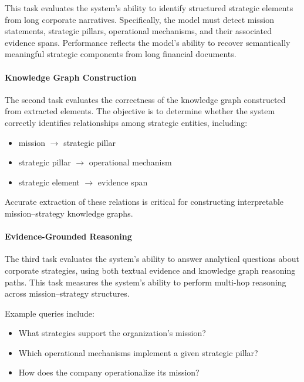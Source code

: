 \documentclass[11pt]{article}
\begin{document}
This task evaluates the system's ability to identify structured strategic elements from long corporate narratives. Specifically, the model must detect mission statements, strategic pillars, operational mechanisms, and their associated evidence spans. Performance reflects the model’s ability to recover semantically meaningful strategic components from long financial documents.

\paragraph{Knowledge Graph Construction}

The second task evaluates the correctness of the knowledge graph constructed from extracted elements. The objective is to determine whether the system correctly identifies relationships among strategic entities, including:

\begin{itemize}[leftmargin=1.0em, itemsep=0.05em, topsep=0.05em]
\item mission $\rightarrow$ strategic pillar
\item strategic pillar $\rightarrow$ operational mechanism
\item strategic element $\rightarrow$ evidence span
\end{itemize}

Accurate extraction of these relations is critical for constructing interpretable mission–strategy knowledge graphs.

\paragraph{Evidence-Grounded Reasoning}

The third task evaluates the system's ability to answer analytical questions about corporate strategies, using both textual evidence and knowledge graph reasoning paths. This task measures the system’s ability to perform multi-hop reasoning across mission–strategy structures.

Example queries include:

\begin{itemize}[leftmargin=1.0em, itemsep=0.05em, topsep=0.05em]
\item What strategies support the organization’s mission?
\item Which operational mechanisms implement a given strategic pillar?
\item How does the company operationalize its mission?
\end{itemize}
\end{document}
